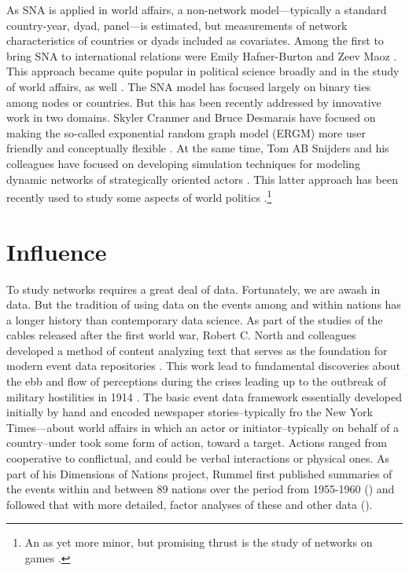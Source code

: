 \documentclass[12pt,oneside,doublespace,pdflatex]{amsart}
\begin{document}
As SNA is applied in world affairs, a non-network model---typically a standard country-year, dyad, panel---is estimated, but measurements of network characteristics of countries or dyads included as covariates.  Among the first to bring SNA to international relations were Emily Hafner-Burton \citep{hafner-burton:2006,hafner-burton:kahler:etal:2009} and Zeev Maoz \citep{maoz:2006a,maoz:terris:etal:2007,maoz:2010}.  This approach became quite popular in political science broadly
\citep{ward:stovel:etal:2011} and in the study of world affairs, as well 
\citep[for example]{lagazio:russett:2004,warren:2010,maoz2012special,kinne:2012,kinne:2013,kinne:2014,murdie:2014,haim:2016,wilson:etal:2016,warren:2016,ward:dorussen:2016,boehmelt:2016,kinne:2016,lupu:poast:2016,gartzke:westerwinter:2016,maoz:joyce:2016}.  The SNA model has focused largely on binary ties among nodes or countries. But this has been recently addressed by innovative work in two domains.  Skyler Cranmer and Bruce Desmarais have focused on making the so-called exponential random graph model (ERGM) more user friendly and conceptually flexible \citep{cranmer:desmarais:2011,cranmer:desmarais:etal:2012,desmarais:cranmer:2012,cranmer:desmarais:2015c}.  At the same time, Tom AB Snijders and his colleagues have focused on developing simulation techniques for modeling dynamic networks of strategically oriented actors 
\citep{snijders:etal:2010,snijders:2014,amati:2015}.  This latter approach has been recently used to study some aspects of world politics \citep{manger:pickup:2016}.\footnote{An as yet more minor, but promising thrust is the study of networks on games \citep{metternich:dorff:etal:2013,gallop:2015,gallop:2016,chyzh:2016,larson:2016}.}

\section*{Influence}

To study networks requires a great deal of data. Fortunately, we are awash in data.  But the tradition of using data on the events among and within nations has a longer history than contemporary data science. As part of the studies of the cables released after the first world war, Robert C. North and colleagues developed a method of content analyzing text that serves as the foundation for modern event data repositories \citep{north:etal:1963}. This work lead to fundamental discoveries about the ebb and flow of perceptions during the crises leading up to the outbreak of military hostilities in 1914 \citep{north:1967}.
The basic event data framework essentially developed initially by hand and encoded newspaper stories--typically fro the New York Times---about
world affairs in which an actor or initiator--typically on behalf of a country--under took some form of action, toward a target. Actions ranged from cooperative to conflictual, and could be verbal interactions or physical ones.  As part of his Dimensions of Nations project, Rummel first published summaries of the events within and between 89 nations over the period from 1955-1960  (\citeyear{rummel:1963}) and followed that with more detailed, factor analyses of these and other data (\citeyear{rummel:1976a}).
\end{document}
